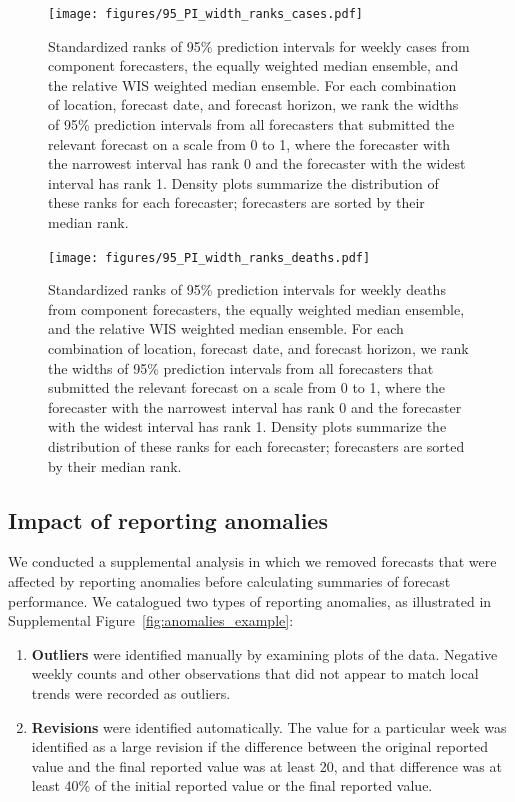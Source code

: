 \documentclass{article}
\begin{document}
\begin{figure}
  \texttt{[image: figures/95\_PI\_width\_ranks\_cases.pdf]}
  \caption{Standardized ranks of 95\% prediction intervals for weekly cases from component forecasters, the equally weighted median ensemble, and the relative WIS weighted median ensemble. For each combination of location, forecast date, and forecast horizon, we rank the widths of 95\% prediction intervals from all forecasters that submitted the relevant forecast on a scale from 0 to 1, where the forecaster with the narrowest interval has rank 0 and the forecaster with the widest interval has rank 1. Density plots summarize the distribution of these ranks for each forecaster; forecasters are sorted by their median rank.}
  \label{fig:95_pi_width_cases}
\end{figure}


\begin{figure}
  \texttt{[image: figures/95\_PI\_width\_ranks\_deaths.pdf]}
  \caption{Standardized ranks of 95\% prediction intervals for weekly deaths from component forecasters, the equally weighted median ensemble, and the relative WIS weighted median ensemble. For each combination of location, forecast date, and forecast horizon, we rank the widths of 95\% prediction intervals from all forecasters that submitted the relevant forecast on a scale from 0 to 1, where the forecaster with the narrowest interval has rank 0 and the forecaster with the widest interval has rank 1. Density plots summarize the distribution of these ranks for each forecaster; forecasters are sorted by their median rank.}
  \label{fig:95_pi_width_deaths}
\end{figure}

\newpage

\subsection{Impact of reporting anomalies}

We conducted a supplemental analysis in which we removed forecasts that were affected by reporting anomalies before calculating summaries of forecast performance. We catalogued two types of reporting anomalies, as illustrated in Supplemental Figure~\ref{fig:anomalies_example}:
\begin{enumerate}
    \item \textbf{Outliers} were identified manually by examining plots of the data. Negative weekly counts and other observations that did not appear to match local trends were recorded as outliers.
    \item \textbf{Revisions} were identified automatically. The value for a particular week was identified as a large revision if the difference between the original reported value and the final reported value was at least 20, and that difference was at least 40\% of the initial reported value or the final reported value.
\end{enumerate}
\end{document}
